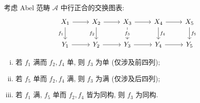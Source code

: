 \begin{proposition}[五项引理]\label{prop:5-lemma}
	考虑 Abel 范畴 $\mathcal{A}$ 中行正合的交换图表:
	\[\begin{tikzcd}
		X_1 \arrow[r] \arrow[d, "f_1"'] & X_2 \arrow[r] \arrow[d, "f_2"'] & X_3 \arrow[r] \arrow[d, "f_3" description] & X_4 \arrow[r] \arrow[d, "f_4"] & X_5 \arrow[d, "f_5"] \\
		Y_1 \arrow[r] & Y_2 \arrow[r] & Y_3 \arrow[r] & Y_4 \arrow[r] & Y_5
	\end{tikzcd}\]
	\begin{enumerate}[(i)]
		\item 若 $f_1$ 满而 $f_2, f_4$ 单, 则 $f_3$ 为单 (仅涉及前四列);
		\item 若 $f_5$ 单而 $f_2, f_4$ 满, 则 $f_3$ 为满 (仅涉及后四列);
		\item 若 $f_1$ 满, $f_5$ 单而 $f_2, f_4$ 皆为同构, 则 $f_3$ 为同构.
	\end{enumerate}
\end{proposition}
